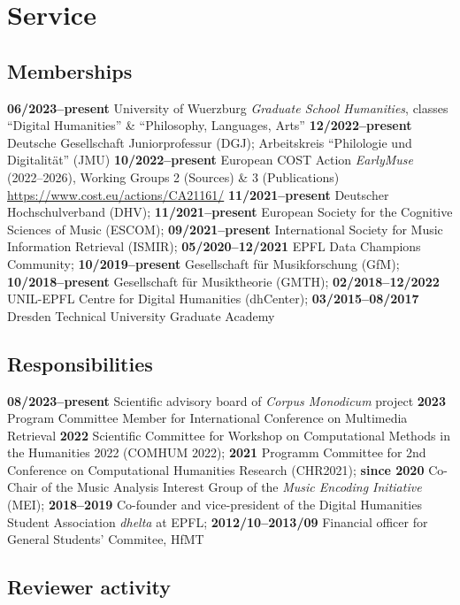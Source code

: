 \section{Service}

\subsection{Memberships}

\textbf{06/2023--present} University of Wuerzburg \emph{Graduate School Humanities}, classes ``Digital Humanities'' \& ``Philosophy, Languages, Arts''
\textbf{12/2022--present} Deutsche Gesellschaft Juniorprofessur (DGJ); Arbeitskreis ``Philologie und Digitalität'' (JMU)
\textbf{10/2022--present} European COST Action \emph{EarlyMuse} (2022--2026), Working Groups 2 (Sources) \& 3 (Publications) \url{https://www.cost.eu/actions/CA21161/}
\textbf{11/2021--present} Deutscher Hochschulverband (DHV);
\textbf{11/2021--present} European Society for the Cognitive Sciences of Music (ESCOM);
\textbf{09/2021--present} International Society for Music Information Retrieval (ISMIR);
\textbf{05/2020--12/2021} EPFL Data Champions Community;
\textbf{10/2019--present} Gesellschaft f{\"u}r Musikforschung (GfM);
\textbf{10/2018--present} Gesellschaft f{\"u}r Musiktheorie (GMTH);
\textbf{02/2018--12/2022} UNIL-EPFL Centre for Digital Humanities (dhCenter);
\textbf{03/2015--08/2017} Dresden Technical University Graduate Academy

\subsection{Responsibilities}

\textbf{08/2023--present} Scientific advisory board of \textit{Corpus Monodicum} project
\textbf{2023} Program Committee Member for International Conference on Multimedia
Retrieval
\textbf{2022} Scientific Committee for Workshop on Computational Methods in the Humanities 2022 (COMHUM 2022);
\textbf{2021} Programm Committee for 2nd Conference on Computational Humanities Research (CHR2021);
\textbf{since 2020} Co-Chair of the Music Analysis Interest Group of the \emph{Music Encoding Initiative} (MEI);
\textbf{2018--2019} Co-founder and vice-president of the Digital Humanities Student Association \emph{dhelta} at EPFL;
\textbf{2012/10--2013/09} Financial officer for General Students' Commitee, HfMT

\subsection{Reviewer activity}

